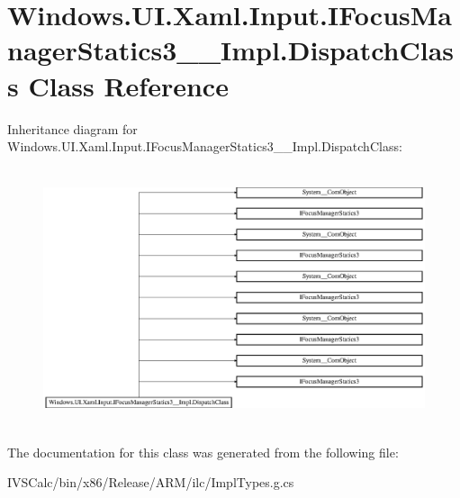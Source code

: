 \hypertarget{class_windows_1_1_u_i_1_1_xaml_1_1_input_1_1_i_focus_manager_statics3_____impl_1_1_dispatch_class}{}\section{Windows.\+U\+I.\+Xaml.\+Input.\+I\+Focus\+Manager\+Statics3\+\_\+\+\_\+\+Impl.\+Dispatch\+Class Class Reference}
\label{class_windows_1_1_u_i_1_1_xaml_1_1_input_1_1_i_focus_manager_statics3_____impl_1_1_dispatch_class}
Inheritance diagram for Windows.\+U\+I.\+Xaml.\+Input.\+I\+Focus\+Manager\+Statics3\+\_\+\+\_\+\+Impl.\+Dispatch\+Class\+:\begin{figure}[H]
\begin{center}
\leavevmode
\includegraphics[height=7.604939cm]{class_windows_1_1_u_i_1_1_xaml_1_1_input_1_1_i_focus_manager_statics3_____impl_1_1_dispatch_class}
\end{center}
\end{figure}


The documentation for this class was generated from the following file\+:\begin{DoxyCompactItemize}
\item 
I\+V\+S\+Calc/bin/x86/\+Release/\+A\+R\+M/ilc/Impl\+Types.\+g.\+cs\end{DoxyCompactItemize}
